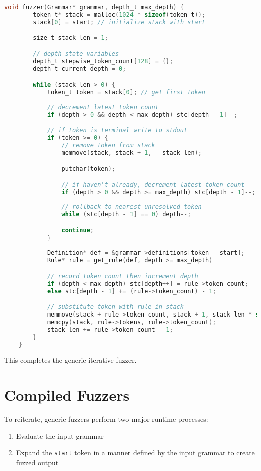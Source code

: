 \documentclass[8pt, twoside]{extarticle}
\begin{document}
\begin{lstlisting}[gobble=2, language=C, caption={Depth-limited generic iterative fuzzer}] 
	void fuzzer(Grammar* grammar, depth_t max_depth) {
		token_t* stack = malloc(1024 * sizeof(token_t));
		stack[0] = start; // initialize stack with start

		size_t stack_len = 1;

		// depth state variables
		depth_t stepwise_token_count[128] = {};
		depth_t current_depth = 0;

		while (stack_len > 0) {
			token_t token = stack[0]; // get first token
			
			// decrement latest token count
			if (depth > 0 && depth < max_depth) stc[depth - 1]--;

			// if token is terminal write to stdout
			if (token >= 0) {
				// remove token from stack
				memmove(stack, stack + 1, --stack_len);

				putchar(token);

				// if haven't already, decrement latest token count
				if (depth > 0 && depth >= max_depth) stc[depth - 1]--;
							
				// rollback to nearest unresolved token
				while (stc[depth - 1] == 0) depth--;

				continue;
			}
			
			Definition* def = &grammar->definitions[token - start];
			Rule* rule = get_rule(def, depth >= max_depth)

			// record token count then increment depth
			if (depth < max_depth) stc[depth++] = rule->token_count;
			else stc[depth - 1] += (rule->token_count) - 1;

			// substitute token with rule in stack 
			memmove(stack + rule->token_count, stack + 1, stack_len * sizeof(token_t));
			memcpy(stack, rule->tokens, rule->token_count);
			stack_len += rule->token_count - 1; 
		}
	}
\end{lstlisting}

This completes the generic iterative fuzzer.


\section{Compiled Fuzzers} \label{sec:compfuzz}

To reiterate, generic fuzzers perform two major runtime processes:

\begin{enumerate}
	\item Evaluate the input grammar
	\item Expand the \verb|start| token in a manner defined by the input grammar to create fuzzed output
\end{enumerate}
\end{document}
